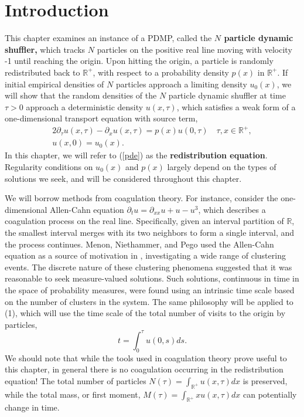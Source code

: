 











\section{Introduction}



This chapter examines an instance of a PDMP, called the \textbf{$N$ particle dynamic shuffler,}  which tracks $N$ particles on the positive real line moving with velocity -1 until reaching the origin.  Upon hitting the origin, a particle is randomly redistributed back to $\mathbb{R}^+$, with respect to a probability density $p(x)$ in $\mathbb R^+$. If initial empirical densities of $N$ particles approach a limiting density $u_0(x)$, we will show that the random densities of the $N$ particle dynamic shuffler at time $\tau>0$ approach a deterministic density $u(x,\tau)$, which satisfies a weak form of a one-dimensional transport equation with source term, 
\begin{alignat}{2}  \label{pde}
\partial_\tau u(x,\tau) - \partial_x u(x,\tau) = p(x)u(0,\tau) \quad \tau, x \in \mathbb{R}^+, \\
u(x,0) = u_0(x) . \nonumber
\end{alignat}
 In this chapter, we will refer to (\ref{pde}) as the \textbf{redistribution equation}.  Regularity conditions on $u_0(x)$ and $p(x)$ largely depend on the types of solutions we seek, and will be considered throughout this chapter.

  
  


We will borrow methods from coagulation theory. For instance, consider the one-dimensional Allen-Cahn equation $\partial_t u = \partial_{xx} u+u-u^3$, which describes a coagulation process on the real line. Specifically, given an interval partition of $\mathbb R$, the smallest interval merges with its two neighbors to form a single interval, and the process continues. Menon, Niethammer, and Pego used the Allen-Cahn equation as a source of motivation in \cite{menon2010dynamics},  investigating a wide range of clustering events.  The discrete nature of these clustering phenomena  suggested that it was reasonable to seek measure-valued solutions.  Such solutions, continuous in time in the space of probability measures, were found using an intrinsic time scale based on the number of clusters in the system.  The same philosophy will be applied to (1), which will use the time scale
of the total number of visits to the origin by particles,
\begin{equation}\label{cov}
t = \int_0^{\tau} u(0,s)ds.
\end{equation}
   We should note that while the tools used in coagulation theory prove useful to this chapter, in general there is no coagulation occurring in the redistribution equation!  The total number of particles $N(\tau)= \int_{\mathbb{R}^+}u(x,\tau)dx$ is preserved, while the total mass, or first moment, $M(\tau) = \int_{\mathbb{R}^+} xu(x,\tau)dx$ can potentially change in time.

